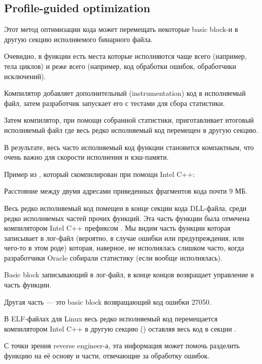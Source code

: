 

\subsection{Profile-guided optimization}
\label{PGO}

\myindex{\oracle}

Этот метод оптимизации кода может перемещать некоторые \gls{basic block}-и в другую секцию
исполняемого бинарного файла.

Очевидно, в функции есть места которые исполняются чаще всего (например, тела циклов)
и реже всего (например, код обработки ошибок, обработчики исключений).

Компилятор добавляет дополнительный (instrumentation) код в исполняемый файл,
затем разработчик запускает его с тестами для сбора статистики.

Затем компилятор, при помощи собранной статистики, приготавливает итоговый исполняемый
файл где весь редко исполняемый код перемещен в другую секцию.

В результате, весь часто исполняемый код функции становится компактным, что очень важно для скорости
исполнения и кэш-памяти.

Пример из \oracle, который скомпилирован при помощи Intel C++:



Расстояние между двумя адресами приведенных фрагментов кода почти 9 МБ.

Весь редко исполняемый код помещен в конце секции кода DLL-файла, среди редко
исполняемых частей прочих функций.
Эта часть функции была отмечена компилятором Intel C++ префиксом .
Мы видим часть функции которая записывает в лог-файл (вероятно, в случае ошибки или предупреждения,
или чего-то в этом роде) которая, наверное, не исполнялась слишком часто, когда разработчики Oracle
собирали статистику (если вообще исполнялась).

Basic block записывающий в лог-файл, в конце концов возвращает управление в  часть
функции.

Другая  часть --- это \gls{basic block} возвращающий код ошибки 27050.

В ELF-файлах для Linux весь редко исполняемый код перемещается компилятором Intel C++
в другую секцию () оставляя весь  код в секции .

С точки зрения reverse engineer-а, эта информация может помочь разделить функцию на её основу
и части, отвечающие за обработку ошибок.
